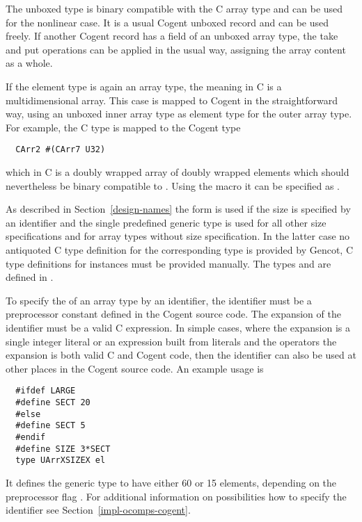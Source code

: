 The unboxed type  is binary compatible with the C array type and can be used for
the nonlinear case. It is a usual Cogent unboxed record and can be used freely. 
If another Cogent record has a field of an unboxed array type, the take and put operations can be applied
in the usual way, assigning the array content as a whole.

If the element type  is again an array type, the meaning in C is a multidimensional array.
This case is mapped to Cogent in the straightforward way, using an unboxed inner array type as element type
for the outer array type. For example, the C type  is mapped to the Cogent type
\begin{verbatim}
  CArr2 #(CArr7 U32)
\end{verbatim}
which in C is a doubly wrapped array of doubly wrapped elements which should nevertheless be binary compatible 
to . Using the macro  it can be specified as .

As described in Section~\ref{design-names} the form 
is used if the size is specified by an identifier and the single predefined generic type  is used for all other
size specifications and for array types without size specification. In the latter case no antiquoted C type definition
for the corresponding type  is provided by Gencot, C type definitions for instances must be provided 
manually. The types  and  are defined in .

To specify the  of an array type by an identifier, the identifier must be a preprocessor constant
defined in the Cogent source code. The expansion of the identifier must be a valid C expression. In simple cases,
where the expansion is a single integer literal or an expression built from literals and the operators \code{+ - * /}
the expansion is both valid C and Cogent code, then the identifier can also be used at other places in the Cogent
source code. An example usage is
\begin{verbatim}
  #ifdef LARGE
  #define SECT 20
  #else 
  #define SECT 5
  #endif
  #define SIZE 3*SECT
  type UArrXSIZEX el
\end{verbatim}
It defines the generic type  to have either 60 or 15 elements, depending on the preprocessor flag .
For additional information on possibilities how to specify the identifier see Section~\ref{impl-ocomps-cogent}.

